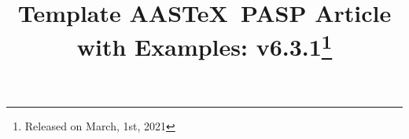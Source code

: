 \documentclass[linenumbers]{aastex631}
\newcommand\aastex{AAS\TeX}
\begin{document}
\title{Template \aastex\ PASP Article with Examples: 
v6.3.1\footnote{Released on March, 1st, 2021}}


\end{document}
